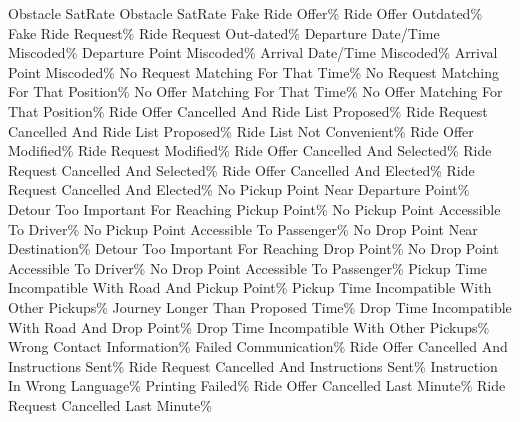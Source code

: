 \bTABLE
\bTR\bTD Obstacle \eTD\bTD SatRate \eTD\bTD Obstacle \eTD\bTD SatRate \eTD\eTR
\bTR\bTD Fake Ride Offer\eTD{}\% \eTD
\bTD Ride Offer Outdated\eTD{}\% \eTD\eTR
\bTR\bTD Fake Ride Request\eTD{}\% \eTD
\bTD Ride Request Out-dated\eTD{}\% \eTD\eTR
\bTR\bTD Departure Date/Time Miscoded\eTD{}\% \eTD
\bTD Departure Point Miscoded\eTD{}\% \eTD\eTR
\bTR\bTD Arrival Date/Time Miscoded\eTD{}\% \eTD
\bTD Arrival Point Miscoded\eTD{}\% \eTD\eTR
\bTR\bTD No Request Matching For That Time\eTD{}\% \eTD
\bTD No Request Matching For That Position\eTD{}\% \eTD\eTR
\bTR\bTD No Offer Matching For That Time\eTD{}\% \eTD
\bTD No Offer Matching For That Position\eTD{}\% \eTD\eTR
\bTR\bTD Ride Offer Cancelled And Ride List Proposed\eTD{}\% \eTD
\bTD Ride Request Cancelled And Ride List Proposed\eTD{}\% \eTD\eTR
\bTR\bTD Ride List Not Convenient\eTD{}\% \eTD
\bTD Ride Offer Modified\eTD{}\% \eTD\eTR
\bTR\bTD Ride Request Modified\eTD{}\% \eTD
\bTD Ride Offer Cancelled And Selected\eTD{}\% \eTD\eTR
\bTR\bTD Ride Request Cancelled And Selected\eTD{}\% \eTD
\bTD Ride Offer Cancelled And Elected\eTD{}\% \eTD\eTR
\bTR\bTD Ride Request Cancelled And Elected\eTD{}\% \eTD
\bTD No Pickup Point Near Departure Point\eTD{}\% \eTD\eTR
\bTR\bTD Detour Too Important For Reaching Pickup Point\eTD{}\% \eTD
\bTD No Pickup Point Accessible To Driver\eTD{}\% \eTD\eTR
\bTR\bTD No Pickup Point Accessible To Passenger\eTD{}\% \eTD
\bTD No Drop Point Near Destination\eTD{}\% \eTD\eTR
\bTR\bTD Detour Too Important For Reaching Drop Point\eTD{}\% \eTD
\bTD No Drop Point Accessible To Driver\eTD{}\% \eTD\eTR
\bTR\bTD No Drop Point Accessible To Passenger\eTD{}\% \eTD
\bTD Pickup Time Incompatible With Road And Pickup Point\eTD{}\% \eTD\eTR
\bTR\bTD Pickup Time Incompatible With Other Pickups\eTD{}\% \eTD
\bTD Journey Longer Than Proposed Time\eTD{}\% \eTD\eTR
\bTR\bTD Drop Time Incompatible With Road And Drop Point\eTD{}\% \eTD
\bTD Drop Time Incompatible With Other Pickups\eTD{}\% \eTD\eTR
\bTR\bTD Wrong Contact Information\eTD{}\% \eTD
\bTD Failed Communication\eTD{}\% \eTD\eTR
\bTR\bTD Ride Offer Cancelled And Instructions Sent\eTD{}\% \eTD
\bTD Ride Request Cancelled And Instructions Sent\eTD{}\% \eTD\eTR
\bTR\bTD Instruction In Wrong Language\eTD{}\% \eTD
\bTD Printing Failed\eTD{}\% \eTD\eTR
\bTR\bTD Ride Offer Cancelled Last Minute\eTD{}\% \eTD
\bTD Ride Request Cancelled Last Minute\eTD{}\% \eTD\eTR
